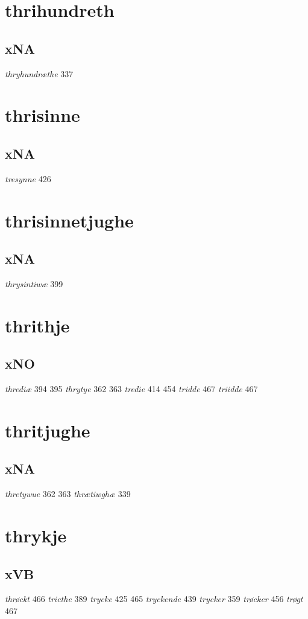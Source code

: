 \documentclass[a4paper,twocolumn]{article}
\begin{document}
\section{thrihundreth}
\label{sec:org88aceab}
\subsection{xNA}
\label{sec:orgf4cce77}
\emph{thryhundræthe} 337 
\section{thrisinne}
\label{sec:org50d8bfd}
\subsection{xNA}
\label{sec:orge0c42b9}
\emph{tresynne} 426 
\section{thrisinnetjughe}
\label{sec:orgffa03b8}
\subsection{xNA}
\label{sec:org21b7873}
\emph{thrysintiwæ} 399 
\section{thrithje}
\label{sec:org3875163}
\subsection{xNO}
\label{sec:orga5244d9}
\emph{thrediæ} 394 395 \emph{thrytye} 362 363 \emph{tredie} 414 454 \emph{tridde} 467 \emph{triidde} 467 
\section{thritjughe}
\label{sec:orgb13868a}
\subsection{xNA}
\label{sec:org63efe18}
\emph{thretywue} 362 363 \emph{thrætiwghæ} 339 
\section{thrykje}
\label{sec:org30945c6}
\subsection{xVB}
\label{sec:org89198b6}
\emph{thrøckt} 466 \emph{tricthe} 389 \emph{trycke} 425 465 \emph{tryckende} 439 \emph{trycker} 359 \emph{trøcker} 456 \emph{trøgt} 467 
\end{document}
